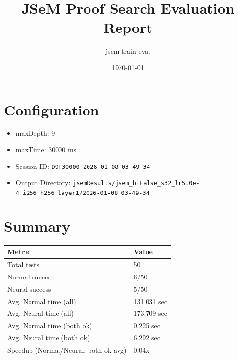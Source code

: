 \documentclass[a4paper,10pt]{article}
\title{JSeM Proof Search Evaluation Report}
\author{jsem-train-eval}
\date{\today}
\begin{document}
\maketitle

\section{Configuration}
\begin{itemize}
\item maxDepth: 9
\item maxTime: 30000 ms
\item Session ID: \texttt{D9T30000\_2026-01-08\_03-49-34}
\item Output Directory: \texttt{jsemResults/jsem\_biFalse\_s32\_lr5.0e-4\_i256\_h256\_layer1/2026-01-08\_03-49-34}
\end{itemize}

\section{Summary}
\begin{tabular}{ll}
\toprule
\textbf{Metric} & \textbf{Value} \\
\midrule
Total tests & 50 \\
Normal success & 6/50 \\
Neural success & 5/50 \\
\midrule
Avg. Normal time (all) & 131.031 sec \\
Avg. Neural time (all) & 173.709 sec \\
Avg. Normal time (both ok) & 0.225 sec \\
Avg. Neural time (both ok) & 6.292 sec \\
Speedup (Normal/Neural; both ok avg) & 0.04x \\
\bottomrule
\end{tabular}
\end{document}
